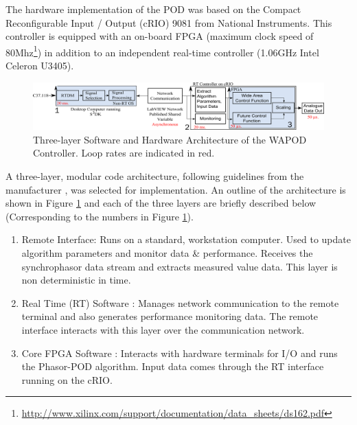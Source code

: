 \documentclass[journal]{IEEEtran}
\begin{document}
The hardware implementation of the POD was based on the Compact Reconfigurable Input / Output (cRIO) 9081 \cite{cRIO9081} from National Instruments. This controller is equipped with an on-board FPGA (maximum clock speed of 80Mhz\footnote{\url{http://www.xilinx.com/support/documentation/data_sheets/ds162.pdf}}) in addition to an independent real-time controller (1.06GHz Intel Celeron U3405). 
\begin{figure}[!t]
\centering
\includegraphics[width=6in]{Final_RT_Arch.png} 
\caption{Three-layer Software and Hardware Architecture of the WAPOD Controller. Loop rates are indicated in red.} %
\label{RTArchitecture}
\end{figure}

A three-layer, modular code architecture, following guidelines from the manufacturer \cite{LabviewTemplate}, was selected for implementation. An outline of the architecture is shown in Figure \ref{RTArchitecture} and each of the three layers are briefly described below (Corresponding to the numbers in Figure \ref{RTArchitecture}). 

\begin{enumerate}
\item Remote Interface: Runs on a standard, workstation computer. Used to update algorithm parameters and monitor data \& performance. Receives the synchrophasor data stream and extracts measured value data. This  layer is non deterministic in time.

\item Real Time (RT) Software : Manages network communication to the remote terminal and also generates performance monitoring data. The remote interface interacts with this layer over the communication network.

\item Core FPGA Software : Interacts with hardware terminals for I/O and runs the Phasor-POD algorithm. Input data comes through the RT interface running on the cRIO.

\end{enumerate}
\end{document}
